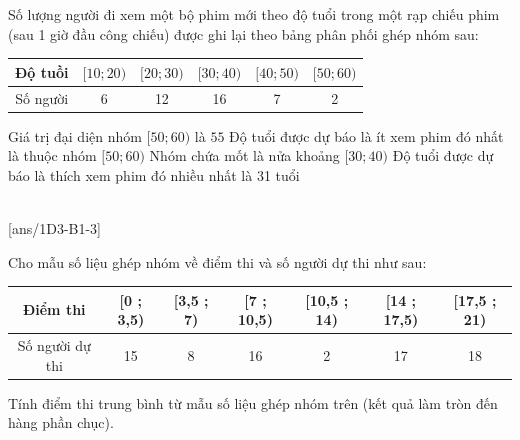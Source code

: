 \begin{ex}
	Số lượng người đi xem một bộ phim mới theo độ tuổi trong một rạp chiếu phim (sau 1 giờ đầu công chiếu) được ghi lại theo bảng phân phối ghép nhóm sau:
	\begin{center}
		\begin{tabular}{|c|c|c|c|c|c|}
			\hline Độ tuồi & {$[10 ; 20)$} & {$[20 ; 30)$} & {$[30 ; 40)$} & {$[40 ; 50)$} & {$[50 ; 60)$} \\
			\hline Số người & 6 & 12 & 16 & 7 & 2 \\
			\hline
		\end{tabular}
	\end{center}
	\choiceTF
	{\True Giá trị đại diện nhóm $[50 ; 60)$ là $55$}
	{\True Độ tuổi được dự báo là ít xem phim đó nhất là thuộc nhóm $[50;60)$}
	{\True  Nhóm chứa mốt là nửa khoảng $[30 ; 40)$}
	{Độ tuổi được dự báo là thích xem phim đó nhiều nhất là 31 tuổi}
	\loigiai{
		
	}
\end{ex}


 \\
[ans/1D3-B1-3]

\begin{ex}
	Cho mẫu số liệu ghép nhóm về điểm thi và số người dự thi như sau:
	
	\begin{center}\begin{tabular}{|c|c|c|c|c|c|c|}
			\hline
			Điểm thi   & [0 ; 3,5) & [3,5 ; 7) & [7 ; 10,5) & [10,5 ; 14) & [14 ; 17,5) & [17,5 ; 21)\\  
			\hline 
			Số người dự thi & 15 & 8 & 16 & 2 & 17 & 18 \\ 
			\hline 
		\end{tabular}
	\end{center}
	Tính điểm thi trung bình từ mẫu số liệu ghép nhóm trên (kết quả làm tròn đến hàng phần chục).\\
	\end{ex}

